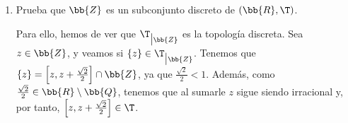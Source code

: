 \begin{ejercicio}
\begin{enumerate}[label=\alph*)]
        Veamos en primer lugar que $[0,1[$ es cerrado. Tenemos que su complementario es $\bb{R}\setminus [0,1[~=]-\infty, 0[~\cup~[1,+\infty[$. El primer intervalo es un abierto en $\T_u\subset \T$. Respecto al segundo, tenemos que:
        \begin{equation*}
            [1,+\infty[~=\bigcup_{\substack{b\in \bb{R}\setminus\bb{Q}\\b>1}}[1,b]\in \T
        \end{equation*}
        Por tanto, tenemos que el segundo intervalo es una unión (no numerable) de abiertos, por lo que es un abierto. Por tanto, $\bb{R}\setminus [0,1[~\in \T$, por lo que $[0,1[$ es un cerrado y, por tanto, $\ol{[0,1[}=[0,1[$.
        

        Además, tenemos que $[0,1[~=\bigcup\limits_{\substack{b\in \bb{R}\setminus\bb{Q}\\0<b<1}}[0,b]\in \T$, por lo que es un abierto y, por tanto, $[0,1[^\circ = [0,1[$.\\


        Trabajamos ahora con $[0,\sqrt{2}]$. Como $\T_u\subset \T$, tenemos que $C_{\T_u}\subset C_{\T}$. Por tanto, tenemos que $[0,\sqrt{2}]\in C_\T$, por lo que $\ol{[0,\sqrt{2}]}=[0,\sqrt{2}]$.

        Además, tenemos que es un abierto básico, por lo que $[0,\sqrt{2}]^\circ = [0,\sqrt{2}]$.\\

        Veamos ahora la clausura de $\bb{Q}$. Como los abiertos básicos son intervalos, tenemos que $\bb{Q}\cap B\neq \emptyset$, para todo $B\in \cc{B}$ intervalo y por la densidad de $\bb{Q}$ en $\bb{R}$. Por tanto, como esto es cierto $\forall x\in X$, tenemos que $\ol{Q}=\bb{R}$.

        De igual forma, por la densidad de $\bb{R}\setminus\bb{Q}$ en $\bb{R}$, tenemos que $\nexists B\in \cc{B}$ tal que $B\subset \bb{Q}$. Por tanto, $[\bb{Q}]^\circ = \emptyset$.

        \item Prueba que $\bb{Z}$ es un subconjunto discreto de $(\bb{R},\T)$.

        Para ello, hemos de ver que $\T_{\big| \bb{Z}}$ es la topología discreta. Sea $z\in \bb{Z}$, y veamos si $\{z\}\in \T_{\big| \bb{Z}}$. Tenemos que $\{z\}=\left[z,z+\frac{\sqrt{2}}{2}\right]\cap \bb{Z}$, ya que $\frac{\sqrt{2}}{2}<1$. Además, como $\frac{\sqrt{2}}{2}\in \bb{R}\setminus\bb{Q}$, tenemos que al sumarle $z$ sigue siendo irracional y, por tanto, $\left[z,z+\frac{\sqrt{2}}{2}\right]\in \T$.


\end{enumerate}
\end{ejercicio}
